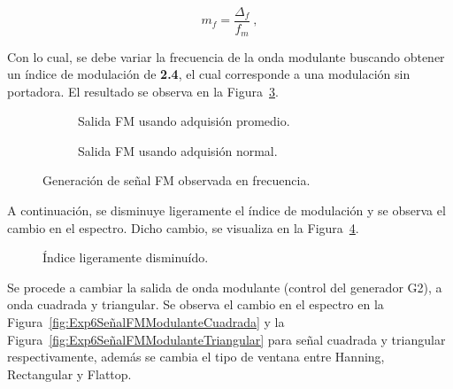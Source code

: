     \begin{equation*}
      m_{f}=\dfrac{\Delta_{f}}{f_{m}}~,
    \end{equation*}

    Con lo cual, se debe variar la frecuencia de la onda modulante buscando obtener 
    un índice de modulación de \textbf{2.4}, el cual corresponde a una modulación sin 
    portadora. El resultado se observa en la 
    Figura~\ref{fig:Exp6SeñalFMindice2_4}.

      \begin{figure}[H]
        \centering
        \begin{subfigure}[H]{0.48\textwidth}
          \caption{Salida FM usando adquisión promedio.}
          \label{fig:Exp6SeñalFMIndice2_4AdquisicionPromedio}
        \end{subfigure}
        \hfill 
        \begin{subfigure}[H]{0.48\textwidth}
          \caption{Salida FM usando adquisión normal.}
          \label{fig:Exp6SeñalFMIndice2_4AdquisicionNormal}
        \end{subfigure}
        \caption{Generación de señal FM observada en frecuencia.}
        \label{fig:Exp6SeñalFMindice2_4}
      \end{figure}   

    A continuación, se disminuye ligeramente el índice de modulación y se 
    observa el cambio en el espectro. Dicho cambio, se visualiza en la 
    Figura~\ref{fig:Exp6SeñalFMIndiceDisminuido}.

      \begin{figure}[H]
        \centering
          \caption{Índice ligeramente disminuído.}
          \label{fig:Exp6SeñalFMIndiceDisminuido}
      \end{figure}
    
    Se procede a cambiar la salida de onda modulante (control del generador G2), a onda 
    cuadrada y triangular. Se observa el cambio en el espectro en la 
    Figura~\ref{fig:Exp6SeñalFMModulanteCuadrada} y la 
    Figura~\ref{fig:Exp6SeñalFMModulanteTriangular} para señal 
    cuadrada y triangular respectivamente, además se cambia el tipo 
    de ventana entre Hanning, Rectangular y Flattop.

